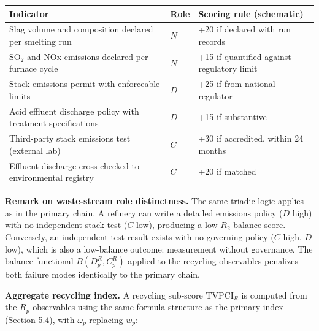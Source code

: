 \documentclass[
  11pt,
  letterpaper,
]{article}
\begin{document}
\begin{longtable}[]{@{}
  >{\raggedright\arraybackslash}p{}
  >{\raggedright\arraybackslash}p{}
  >{\raggedright\arraybackslash}p{}@{}}
\toprule\noalign{}
\begin{minipage}[b]{\linewidth}\raggedright
Indicator
\end{minipage} & \begin{minipage}[b]{\linewidth}\raggedright
Role
\end{minipage} & \begin{minipage}[b]{\linewidth}\raggedright
Scoring rule (schematic)
\end{minipage} \\
\midrule\noalign{}
\endhead
\bottomrule\noalign{}
\endlastfoot
Slag volume and composition declared per smelting run & \(N\) & +20 if
declared with run records \\
SO\(_2\) and NOx emissions declared per furnace cycle & \(N\) & +15 if
quantified against regulatory limit \\
Stack emissions permit with enforceable limits & \(D\) & +25 if from
national regulator \\
Acid effluent discharge policy with treatment specifications & \(D\) &
+15 if substantive \\
Third-party stack emissions test (external lab) & \(C\) & +30 if
accredited, within 24 months \\
Effluent discharge cross-checked to environmental registry & \(C\) & +20
if matched \\
\end{longtable}

\textbf{Remark on waste-stream role distinctness.} The same triadic
logic applies as in the primary chain. A refinery can write a detailed
emissions policy (\(D\) high) with no independent stack test (\(C\)
low), producing a low \(R_2\) balance score. Conversely, an independent
test result exists with no governing policy (\(C\) high, \(D\) low),
which is also a low-balance outcome: measurement without governance. The
balance functional \(B(D_p^R, C_p^R)\) applied to the recycling
observables penalizes both failure modes identically to the primary
chain.

\textbf{Aggregate recycling index.} A recycling sub-score
\(\mathrm{TVPCI}_R\) is computed from the \(R_p\) observables using the
same formula structure as the primary index (Section 5.4), with
\(\omega_p\) replacing \(w_p\):
\end{document}
